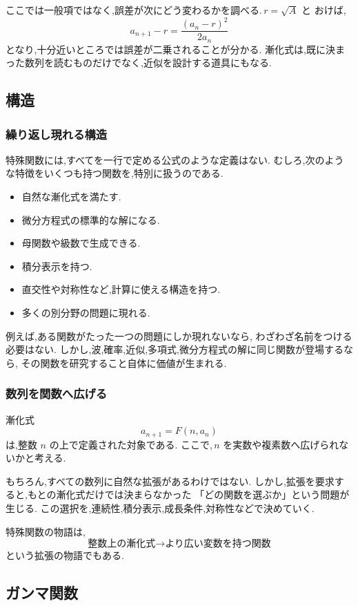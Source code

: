 ここでは一般項ではなく,誤差が次にどう変わるかを調べる.\,$r=\sqrt A$ と
おけば,
\[
  a_{n+1}-r=\frac{(a_n-r)^2}{2a_n}
\]
となり,十分近いところでは誤差が二乗されることが分かる.
漸化式は,既に決まった数列を読むものだけでなく,近似を設計する道具にもなる.

\subsection{構造}

\subsubsection{繰り返し現れる構造}

特殊関数には,すべてを一行で定める公式のような定義はない.
むしろ,次のような特徴をいくつも持つ関数を,特別に扱うのである.

\begin{itemize}
  \item 自然な漸化式を満たす.
  \item 微分方程式の標準的な解になる.
  \item 母関数や級数で生成できる.
  \item 積分表示を持つ.
  \item 直交性や対称性など,計算に使える構造を持つ.
  \item 多くの別分野の問題に現れる.
\end{itemize}

例えば,ある関数がたった一つの問題にしか現れないなら,
わざわざ名前をつける必要はない.
しかし,波,確率,近似,多項式,微分方程式の解に同じ関数が登場するなら,
その関数を研究すること自体に価値が生まれる.

\subsubsection{数列を関数へ広げる}

漸化式
\[
  a_{n+1}=F(n,a_n)
\]
は,整数 $n$ の上で定義された対象である.
ここで,\,$n$ を実数や複素数へ広げられないかと考える.

もちろん,すべての数列に自然な拡張があるわけではない.
しかし,拡張を要求すると,もとの漸化式だけでは決まらなかった
「どの関数を選ぶか」という問題が生じる.
この選択を,連続性,積分表示,成長条件,対称性などで決めていく.

特殊関数の物語は,
\[
  \text{整数上の漸化式}
  \longrightarrow
  \text{より広い変数を持つ関数}
\]
という拡張の物語でもある.

\subsection{ガンマ関数}

